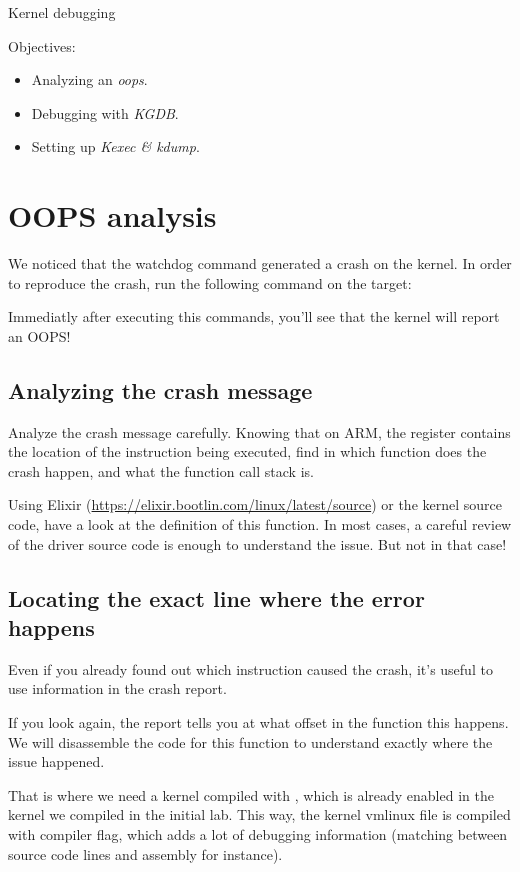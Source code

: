 \subchapter
{Kernel debugging}
{Objectives:
  \begin{itemize}
	  \item Analyzing an {\em oops}.
	  \item Debugging with {\em KGDB}.
	  \item Setting up {\em Kexec \& kdump}.
  \end{itemize}
}

\section{OOPS analysis}
We noticed that the watchdog command generated a crash on the kernel. In order
to reproduce the crash, run the following command on the target:


Immediatly after executing this commands, you'll see that the kernel will report
an OOPS!

\subsection{Analyzing the crash message}

Analyze the crash message carefully. Knowing that on ARM, the 
register contains the location of the instruction being executed, find
in which function does the crash happen, and what the function call
stack is.

Using Elixir (\url{https://elixir.bootlin.com/linux/latest/source}) or the
kernel source code, have a look at the definition of this function. In most
cases, a careful review of the driver source code is enough to understand the
issue. But not in that case!

\subsection{Locating the exact line where the error happens}

Even if you already found out which instruction caused the crash, it's
useful to use information in the crash report.

If you look again, the report tells you at what offset in the function
this happens. We will disassemble the code for this function to understand
exactly where the issue happened.

That is where we need a kernel compiled with ,
which is already enabled in the kernel we compiled in the initial lab.
This way, the kernel vmlinux file is compiled with  compiler flag,
which adds a lot of debugging information (matching between source code
lines and assembly for instance).

